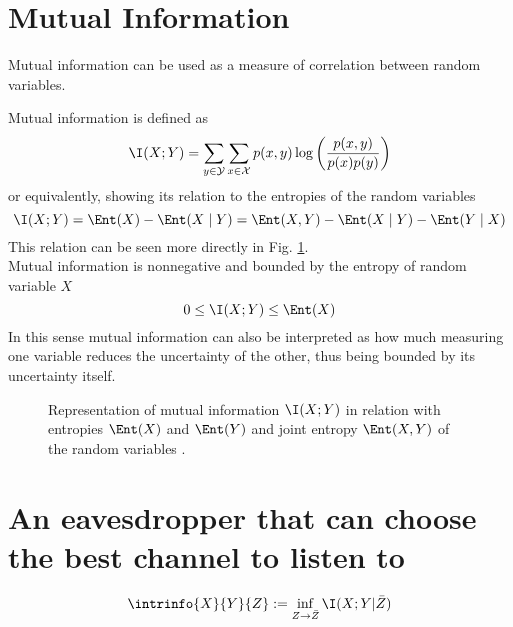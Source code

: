 \section{Mutual Information}
    Mutual information can be used as a measure of correlation between random variables. 
	
	Mutual information is defined as
	\begin{equation}
		\I(X;Y) = \sum_{y\in\mathcal{Y}}\sum_{x\in\mathcal{X}} p(x,y) \log\left(\frac{p(x,y)}{p(x)p(y)}\right) 
	\end{equation}
	or equivalently, showing its relation to the entropies of the random variables
	\begin{equation}
		\I(X;Y) = \Ent(X) - \Ent(X\mid Y) = \Ent(X,Y) - \Ent(X\mid Y) - \Ent(Y\mid X)
	\end{equation}
	This relation can be seen more directly in Fig. \ref{fig:mutual_info}.\\
	Mutual information is nonnegative and bounded by the entropy of random variable $X$
	\begin{equation}
		0 \leq \I(X;Y) \leq \Ent(X)
	\end{equation}
	In this sense mutual information can also be interpreted as how much measuring one variable reduces the uncertainty of the other, thus being bounded by its uncertainty itself.
	
	\begin{figure}[h]
		\centering
		
		\caption{Representation of mutual information $\I(X;Y)$ in relation with entropies $\Ent(X)$ and $\Ent(Y)$ and joint entropy $\Ent(X,Y)$ of the random variables .
		\label{fig:mutual_info}}
	\end{figure}	
\section{An eavesdropper that can choose the best channel to listen to}
   
    \begin{equation} \label{intrininfo}
    	\intrinfo{X}{Y}{Z}:= \inf_{Z\rightarrow \bar{Z}} \I(X;Y | \bar{Z})
    \end{equation}
